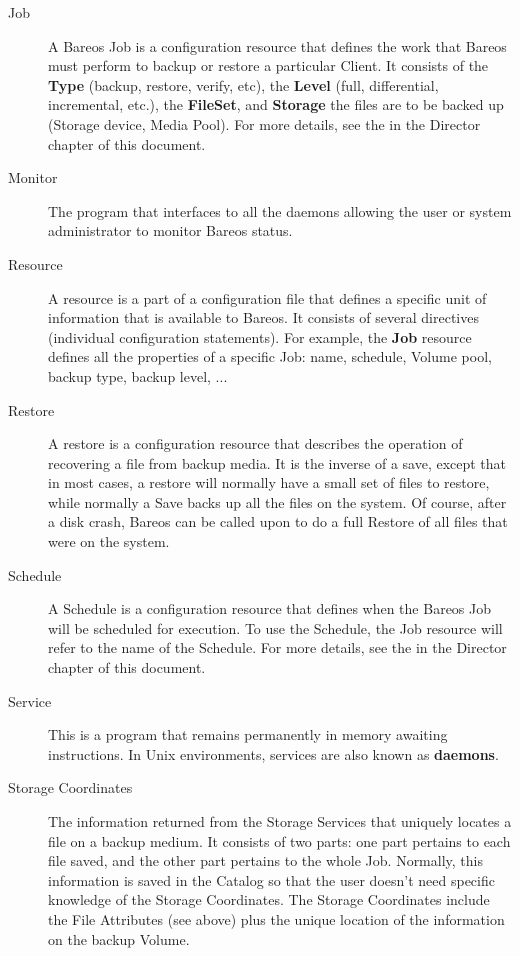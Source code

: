 \begin{description}
\label{JobDef}
\item [Job]
   A Bareos Job is a configuration resource that defines the work that
   Bareos must perform to backup or restore a particular Client.  It
   consists of the {\bf Type} (backup, restore, verify, etc), the {\bf
   Level} (full, differential, incremental, etc.), 
   the {\bf FileSet}, and {\bf Storage} the
   files are to be backed up (Storage device, Media Pool).  For more
   details, see the  in the
   Director chapter of this document.

\item [Monitor]
   The program that interfaces to all the daemons  allowing the user or
   system administrator to monitor Bareos status.

\item [Resource]
   A resource is a part of a configuration file that defines a specific
   unit of information that is available to Bareos.  It consists of several
   directives (individual configuration statements).  For example, the {\bf
   Job} resource defines all the properties of a specific Job: name,
   schedule, Volume pool, backup type, backup level, ...

\item [Restore]
   A restore is a configuration resource that describes the operation of
   recovering a file from backup media.  It is the inverse of a save,
   except that in most cases, a restore will normally have a small set of
   files to restore, while normally a Save backs up all the files on the
   system.  Of course, after a disk crash, Bareos can be called upon to do
   a full Restore of all files that were on the system.

\item [Schedule]
   A Schedule is a configuration resource that defines when the Bareos Job
   will be scheduled for execution.  To use the Schedule, the Job resource
   will refer to the name of the Schedule.  For more details, see the
    in the Director
   chapter of this document.

\item [Service]
   This is a program that remains permanently in memory awaiting
   instructions.  In Unix environments, services are also known as
   {\bf daemons}.

\item [Storage Coordinates]
   The information returned from the Storage Services that uniquely locates
   a file on a backup medium.  It consists of two parts: one part pertains
   to each file saved, and the other part pertains to the whole Job.
   Normally, this information is saved in the Catalog so that the user
   doesn't need specific knowledge of the Storage Coordinates.  The Storage
   Coordinates include the File Attributes (see above) plus the unique
   location of the information on the backup Volume.


\end{description}
